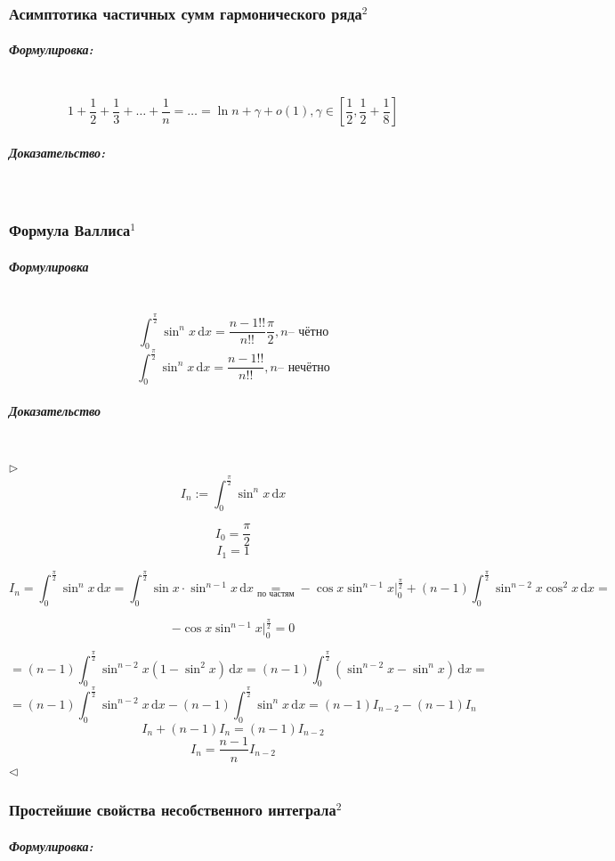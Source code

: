 \documentclass{article}
\def\D{\,\mathrm{d}}
\let\vanillasubparagraph\subparagraph
\renewcommand{\subparagraph}[1]{\vanillasubparagraph{#1}\mbox{}\\}
\begin{document}
\subsubsection{Асимптотика частичных сумм гармонического ряда\texorpdfstring{$^2$}{}}

\subparagraph{Формулировка:}

\[1 + \frac{1}{2} + \frac{1}{3} + \ldots + \frac{1}{n} = \ldots = \ln{n} + \gamma + o(1), \gamma \in \left[\frac{1}{2}, \frac{1}{2} + \frac{1}{8}\right]\]

\subparagraph{Доказательство:}




\subsubsection{Формула Валлиса\texorpdfstring{$^1$}{}}\label{Валлис}
\subparagraph{Формулировка}
$$
\int_0^{\frac{\pi}{2}}\sin^n x \D x = \frac{n-1!!}{n!!}\frac{\pi}{2}, n\text{-- чётно}
$$
$$
\int_0^{\frac{\pi}{2}}\sin^n x \D x = \frac{n-1!!}{n!!}, n\text{-- нечётно}
$$

\subparagraph{Доказательство}
$\rhd$
$$
I_n := \int_0^{\frac{\pi}{2}}\sin^n x \D x
$$

$$
I_0 = \frac{\pi}{2}
$$
$$
I_1 = 1
$$

$$
I_n = \int_0^{\frac{\pi}{2}}\sin^n x \D x = \int_0^{\frac{\pi}{2}}\sin x \cdot \sin^{n-1}x \D x \underset{\text{по частям}}{=} -\cos x \sin^{n-1} x |_0^{\frac{\pi}{2}} + (n-1)\int_0^\frac{\pi}{2} \sin^{n-2}x \cos^2x \D x =
$$

$$
-\cos x \sin^{n-1} x |_0^{\frac{\pi}{2}} = 0
$$

$$
= (n-1)\int_0^\frac{\pi}{2} \sin^{n-2}x (1 - \sin^2x) \D x = (n-1)\int_0^\frac{\pi}{2} (\sin^{n-2}x - \sin^n x) \D x = 
$$
$$
= (n-1)\int_0^\frac{\pi}{2} \sin^{n-2}x \D x - (n-1)\int_0^\frac{\pi}{2} \sin^n x \D x = (n-1) I_{n-2} - (n-1) I_n 
$$
$$
I_n + (n-1)I_n = (n-1)I_{n-2}
$$
$$
I_n = \frac{n-1}{n}I_{n-2}
$$
$\lhd$

\subsubsection{Простейшие свойства несобственного интеграла\texorpdfstring{$^2$}{}}

\subparagraph{Формулировка:}
\end{document}
